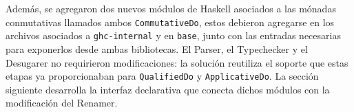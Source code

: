 Además, se agregaron dos nuevos módulos de \textsf{Haskell} asociados a las mónadas conmutativas llamados ambos \texttt{CommutativeDo}, estos debieron agregarse en los archivos asociados a \texttt{ghc-internal} y en \texttt{base}, junto con las entradas necesarias para exponerlos desde ambas bibliotecas. El Parser, el Typechecker y el Desugarer no requirieron modificaciones: la solución reutiliza el soporte que estas etapas ya proporcionaban para \texttt{QualifiedDo} y \texttt{ApplicativeDo}. La sección siguiente desarrolla la interfaz declarativa que conecta dichos módulos con la modificación del Renamer.
